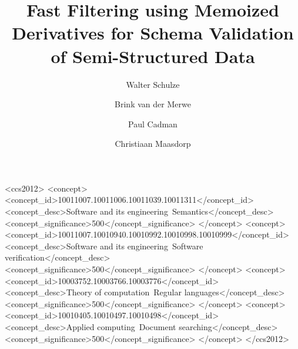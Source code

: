 \documentclass[acmsmall,%
  screen,%
  authorversion, %
  nonacm%
]{acmart}
\begin{document}
\title[Memoized Filtering of Semi-Structured Data]{Fast Filtering using Memoized Derivatives for Schema Validation of Semi-Structured Data}

\author{Walter {Schulze}}

\author{Brink {van der Merwe}}

\author{Paul {Cadman}}

\author{Christiaan {Maasdorp}}

\renewcommand{\shortauthors}{Schulze, et al.}

\begin{CCSXML}
<ccs2012>
   <concept>
       <concept_id>10011007.10011006.10011039.10011311</concept_id>
       <concept_desc>Software and its engineering~Semantics</concept_desc>
       <concept_significance>500</concept_significance>
       </concept>
   <concept>
       <concept_id>10011007.10010940.10010992.10010998.10010999</concept_id>
       <concept_desc>Software and its engineering~Software verification</concept_desc>
       <concept_significance>500</concept_significance>
       </concept>
   <concept>
       <concept_id>10003752.10003766.10003776</concept_id>
       <concept_desc>Theory of computation~Regular languages</concept_desc>
       <concept_significance>500</concept_significance>
       </concept>
   <concept>
       <concept_id>10010405.10010497.10010498</concept_id>
       <concept_desc>Applied computing~Document searching</concept_desc>
       <concept_significance>500</concept_significance>
       </concept>
 </ccs2012>
\end{CCSXML}
\end{document}
